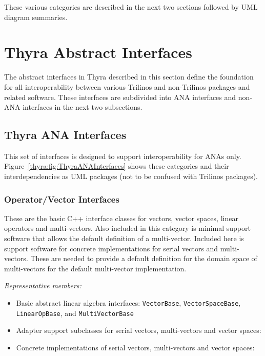 \documentclass[pdf,ps2pdf,11pt]{SANDreport}
\begin{document}
These various categories are described in the next two sections followed by
UML diagram summaries.

%
\section{Thyra Abstract Interfaces}
%

The abstract interfaces in Thyra described in this section define the
foundation for all interoperability between various Trilinos and non-Trilinos
packages and related software.  These interfaces are subdivided into ANA
interfaces and non-ANA interfaces in the next two subsections.

\subsection{Thyra ANA Interfaces}

This set of interfaces is designed to support interoperability for ANAs only.
Figure~\ref{thyra:fig:ThyraANAInterfaces} shows these categories and their
interdependencies as UML packages (not to be confused with Trilinos packages).

%
\subsubsection{Operator/Vector Interfaces}
%

These are the basic C++ interface classes for vectors, vector spaces, linear
operators and multi-vectors.  Also included in this category is minimal
support software that allows the default definition of a multi-vector.
Included here is support software for concrete implementations for serial
vectors and multi-vectors.  These are needed to provide a default definition
for the domain space of multi-vectors for the default multi-vector
implementation.

{}\textit{Representative members:}
\begin{itemize}
%
{}\item Basic abstract linear algebra interfaces: {}\texttt{VectorBase},
{}\texttt{VectorSpaceBase}, {}\texttt{LinearOpBase}, and
{}\texttt{MultiVectorBase}
%
{}\item Adapter support subclasses for serial vectors, multi-vectors and
vector spaces:
%
{}\item Concrete implementations of serial vectors, multi-vectors and vector
spaces:
%
\end{itemize}
\end{document}
